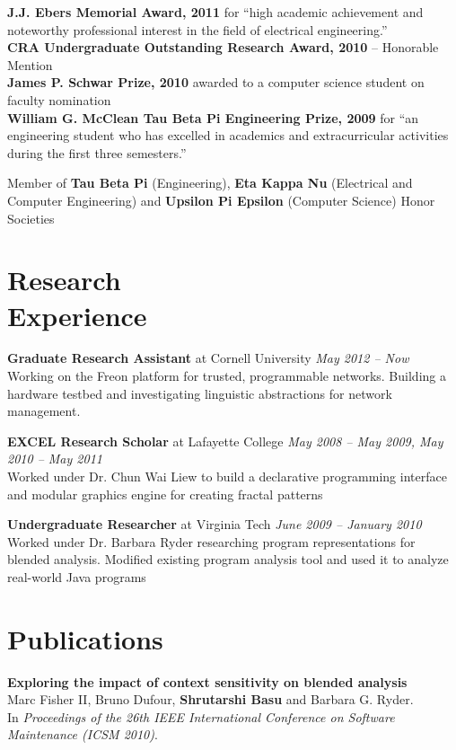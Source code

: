 \documentclass[margin,line]{resume}
\begin{document}
\begin{resume}
    {\bf J.J. Ebers Memorial Award, 2011} for ``high academic achievement and
    noteworthy professional interest in the field of electrical engineering.''\\
    {\bf CRA Undergraduate Outstanding Research Award, 2010} -- Honorable
    Mention \\
    {\bf James P. Schwar Prize, 2010} awarded to a computer science student on
    faculty nomination \\
    {\bf William G. McClean Tau Beta Pi Engineering Prize, 2009} for ``an
    engineering student who has excelled in academics and extracurricular
    activities during the first three semesters.''

    Member of {\bf Tau Beta Pi} (Engineering), {\bf Eta Kappa Nu} (Electrical
    and Computer Engineering) and {\bf Upsilon Pi Epsilon} (Computer Science)
    Honor Societies

    \section{Research\\Experience}

    {\bf Graduate Research Assistant} at Cornell University \hfill
    {\it May 2012 -- Now}\\
    Working on the Freon platform for trusted, programmable networks. Building a
    hardware testbed and investigating linguistic abstractions for network
    management.

    {\bf EXCEL Research Scholar} at Lafayette College \hfill
    {\it May 2008 -- May 2009, May 2010 -- May 2011}\\
    Worked under Dr. Chun Wai Liew to build a declarative programming interface
    and modular graphics engine for creating fractal patterns

    {\bf Undergraduate Researcher} at Virginia Tech \hfill
    {\it June 2009 -- January 2010}\\
    Worked under Dr. Barbara Ryder researching program representations for
    blended analysis. Modified existing program analysis tool and used it to
    analyze real-world Java programs


    \section{Publications}
    {\bf Exploring the impact of context sensitivity on blended analysis} \\
    Marc Fisher II, Bruno Dufour, {\bf Shrutarshi Basu} and Barbara G. Ryder.\\
    In \emph{Proceedings of the 26th IEEE International Conference on Software
      Maintenance (ICSM 2010)}.


\end{resume}
\end{document}
